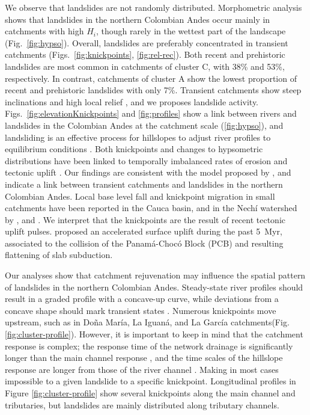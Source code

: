 \documentclass[draft]{agujournal2019}
\begin{document}
\par We observe that landslides are not randomly distributed. Morphometric analysis shows that landslides in the northern Colombian Andes occur mainly in catchments with high $H_i$, though rarely in the wettest part of the landscape (Fig.~\ref{fig:hypso}). Overall, landslides are preferably concentrated in transient catchments (Figs.~\ref{fig:knickpoints}, \ref{fig:rel-rec}). Both recent and prehistoric landslides are most common in catchments of cluster C, with 38\% and 53\%, respectively. In contrast, catchments of cluster A show the lowest proportion of recent and prehistoric landslides with only 7\%. Transient catchments show steep inclinations and high local relief \cite{Whipple1999, matos2016}, and we proposes landslide activity. Figs.~\ref{fig:elevationKnickpoints} and \ref{fig:profiles} show a link between rivers and landslides in the Colombian Andes at the catchment scale (\ref{fig:hypso}), and landsliding is an effective process for hillslopes to adjust river profiles to equilibrium conditions \cite{burbank1996}. Both knickpoints and changes to hypsometric distributions have been linked to temporally imbalanced rates of erosion and tectonic uplift \cite{perez-pena2009}. Our findings are consistent with the model proposed by , and indicate a link between transient catchments and landslides in the northern Colombian Andes. Local base level fall and knickpoint migration in small catchments have been reported in the Cauca basin, and in the Nechí watershed by ,  and . We interpret that the knickpoints are the result of recent tectonic uplift pulses.  proposed an accelerated surface uplift during the past 5~Myr, associated to the collision of the Panamá-Chocó Block (PCB) and resulting flattening of slab subduction.

\par Our analyses show that catchment rejuvenation may influence the spatial pattern of landslides in the northern Colombian Andes. Steady-state river profiles should result in a graded profile with a concave-up curve, while deviations from a concave shape should mark transient states \cite{Whipple1999, Wobus2006}. Numerous knickpoints move upstream, such as in Doña María, La Iguaná, and La García catchments(Fig. \ref{fig:cluster-profile}). However, it is important to keep in mind that the catchment response is complex; the response time of the network drainage is significantly longer than the main channel response \cite{Willett2014}, and the time scales of the hillslope response are longer from those of the river channel \cite{fiona2019}. Making in most cases impossible to a given landslide to a specific knickpoint. Longitudinal profiles in Figure \ref{fig:cluster-profile} show several knickpoints along the main channel and tributaries, but landslides are mainly distributed along tributary channels.
\end{document}
